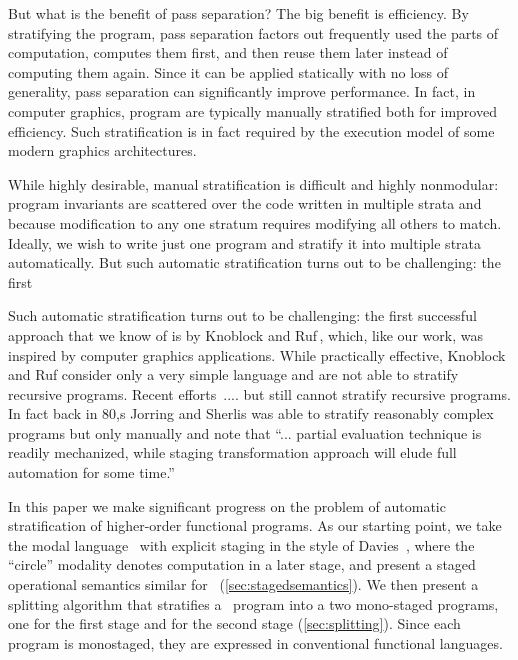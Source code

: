 

But what is the benefit of pass separation? The big benefit is
efficiency. By stratifying the program, pass separation factors out
frequently used the parts of computation, computes them first, and
then reuse them later instead of computing them again.  Since it can
be applied statically with no loss of generality, pass separation can
significantly improve performance.  In fact, in computer graphics,
program are typically manually stratified both for improved
efficiency. Such stratification is in fact required by the execution
model of some modern graphics architectures.  

While highly desirable, manual stratification is difficult and highly
nonmodular: program invariants are scattered over the code written in
multiple strata and because modification to any one stratum requires
modifying all others to match.  Ideally, we wish to write just one
program and stratify it into multiple strata automatically.  But such
automatic stratification turns out to be challenging: the first

Such automatic stratification turns out to be challenging: the first
successful approach that we know of is by Knoblock and
Ruf\,\cite{knoblock96}, which, like our work, was inspired by computer
graphics applications.  While practically effective, Knoblock and Ruf
consider only a very simple language and are not able to stratify
recursive programs.  Recent
efforts\,\cite{Proudfoot:2001,Foley:2011,He:2014} ....  but still
cannot stratify recursive programs.
%
In fact back in 80,s Jorring and Sherlis was able to stratify
reasonably complex programs but only manually and note that
``... partial evaluation technique is readily mechanized, while
staging transformation approach will elude full automation for some
time.''

In this paper we make significant progress on the problem of automatic
stratification of higher-order functional programs.  As our starting
point, we take the modal language \lang\ with explicit staging in
the style of Davies~\cite{davies96}, where the ``circle'' modality
denotes computation in a later stage, and present a staged operational
semantics similar for \lang\ (\ref{sec:stagedsemantics}).  We then
present a splitting algorithm that stratifies a \lang\ program into
a two mono-staged programs, one for the first stage and for the second
stage (\ref{sec:splitting}).  Since each program is monostaged, they
are expressed in conventional functional languages.


